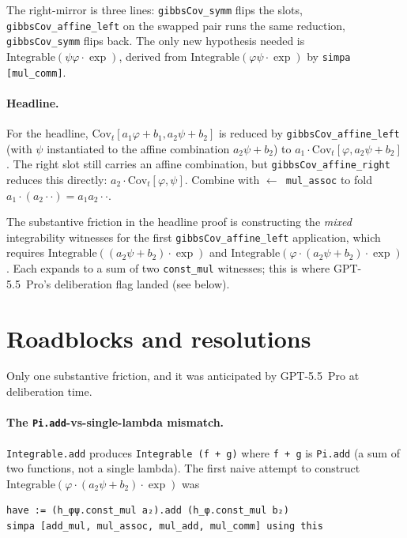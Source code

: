 \documentclass[11pt]{article}
\begin{document}
The right-mirror is three lines: \texttt{gibbsCov\_symm} flips the
slots, \texttt{gibbsCov\_affine\_left} on the swapped pair runs the same
reduction, \texttt{gibbsCov\_symm} flips back. The only new hypothesis
needed is $\mathrm{Integrable}(\psi\varphi\cdot\exp)$, derived from
$\mathrm{Integrable}(\varphi\psi\cdot\exp)$ by
\texttt{simpa [mul\_comm]}.

\paragraph{Headline.} For the headline,
$\mathrm{Cov}_t[a_1\varphi + b_1, a_2\psi + b_2]$ is reduced by
\texttt{gibbsCov\_affine\_left} (with $\psi$ instantiated to the affine
combination $a_2\psi + b_2$) to $a_1 \cdot \mathrm{Cov}_t[\varphi, a_2\psi + b_2]$.
The right slot still carries an affine combination, but
\texttt{gibbsCov\_affine\_right} reduces this directly:
$a_2 \cdot \mathrm{Cov}_t[\varphi, \psi]$. Combine with
\texttt{$\leftarrow$ mul\_assoc} to fold $a_1 \cdot (a_2 \cdot \cdot) = a_1 a_2 \cdot \cdot$.

The substantive friction in the headline proof is constructing the
\emph{mixed} integrability witnesses for the first
\texttt{gibbsCov\_affine\_left} application, which requires
$\mathrm{Integrable}((a_2\psi + b_2)\cdot\exp)$ and
$\mathrm{Integrable}(\varphi\cdot(a_2\psi + b_2)\cdot\exp)$. Each
expands to a sum of two \texttt{const\_mul} witnesses; this is where
GPT-5.5~Pro's deliberation flag landed (see below).

\section{Roadblocks and resolutions}

Only one substantive friction, and it was anticipated by
GPT-5.5~Pro at deliberation time.

\paragraph{The \texttt{Pi.add}-vs-single-lambda mismatch.}
\texttt{Integrable.add} produces \texttt{Integrable (f + g)} where
\texttt{f + g} is \texttt{Pi.add} (a sum of two functions, not a single
lambda). The first naive attempt to construct
$\mathrm{Integrable}(\varphi\cdot(a_2\psi + b_2)\cdot\exp)$ was

\begin{verbatim}
have := (h_φψ.const_mul a₂).add (h_φ.const_mul b₂)
simpa [add_mul, mul_assoc, mul_add, mul_comm] using this
\end{verbatim}
\end{document}
